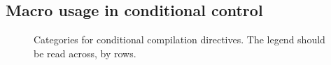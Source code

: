 \documentclass[10pt]{article}
\newcommand{\captionsmall}[1]{\caption[]{\small #1}}
\begin{document}





\subsection{Macro usage in conditional control}
\label{sec:ccd}

\begin{figure}
\centerline{}
\captionsmall{Categories for conditional compilation directives.  The
  legend should be read across, by rows.}
\label{fig:ccd-categories}
\end{figure}
\end{document}

